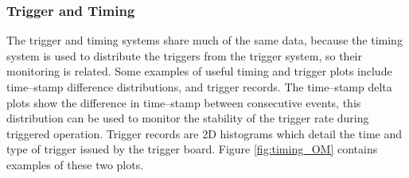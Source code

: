 \subsubsection*{Trigger and Timing}
The trigger and timing systems share much of the same data, because the timing
system is used to distribute the triggers from the trigger system, so their
monitoring is related. Some examples of useful timing and trigger plots include
time--stamp difference distributions, and trigger records. The time--stamp delta
plots show the difference in time--stamp between consecutive events, this
distribution can be used to monitor the stability of the trigger rate during
triggered operation. Trigger records are 2D histograms which detail the time 
and type of trigger issued by the trigger board. Figure \ref{fig:timing_OM} 
contains examples of these two plots.

